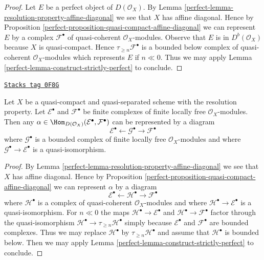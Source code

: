 \begin{proof}

Let $E$ be a perfect object of $D(\mathcal{O}_X)$.
By Lemma \ref{perfect-lemma-resolution-property-affine-diagonal}
we see that $X$ has affine diagonal. Hence by
Proposition \ref{perfect-proposition-quasi-compact-affine-diagonal}
we can represent $E$ by a complex $\mathcal{F}^\bullet$
of quasi-coherent $\mathcal{O}_X$-modules.
Observe that $E$ is in $D^b(\mathcal{O}_X)$ because
$X$ is quasi-compact. Hence $\tau_{\geq n}\mathcal{F}^\bullet$
is a bounded below complex of quasi-coherent $\mathcal{O}_X$-modules
which represents $E$ if $n \ll 0$. Thus we may apply
Lemma \ref{perfect-lemma-construct-strictly-perfect} to conclude.
\end{proof}

\begin{lemma}
\label{perfect-lemma-resolution-property-map-perfect-complex}
\href{https://stacks.math.columbia.edu/tag/0F8G}{\texttt{Stacks tag 0F8G}}

Let $X$ be a quasi-compact and quasi-separated scheme with the
resolution property. Let $\mathcal{E}^\bullet$ and $\mathcal{F}^\bullet$
be finite complexes of finite locally free $\mathcal{O}_X$-modules.
Then any
$\alpha \in \Hom_{D(\mathcal{O}_X)}(\mathcal{E}^\bullet, \mathcal{F}^\bullet)$
can be represented by a diagram
$$
\mathcal{E}^\bullet \leftarrow \mathcal{G}^\bullet \to \mathcal{F}^\bullet
$$
where $\mathcal{G}^\bullet$ is a bounded complex of finite locally free
$\mathcal{O}_X$-modules and where $\mathcal{G}^\bullet \to \mathcal{E}^\bullet$
is a quasi-isomorphism.
\end{lemma}

\begin{proof}

By Lemma \ref{perfect-lemma-resolution-property-affine-diagonal}
we see that $X$ has affine diagonal. Hence by
Proposition \ref{perfect-proposition-quasi-compact-affine-diagonal}
we can represent $\alpha$ by a diagram
$$
\mathcal{E}^\bullet \leftarrow \mathcal{H}^\bullet \to \mathcal{F}^\bullet
$$
where $\mathcal{H}^\bullet$ is a complex of quasi-coherent
$\mathcal{O}_X$-modules and where
$\mathcal{H}^\bullet \to \mathcal{E}^\bullet$
is a quasi-isomorphism. For $n \ll 0$ the maps
$\mathcal{H}^\bullet \to \mathcal{E}^\bullet$ and
$\mathcal{H}^\bullet \to \mathcal{F}^\bullet$
factor through the quasi-isomorphism
$\mathcal{H}^\bullet \to \tau_{\geq n}\mathcal{H}^\bullet$
simply because $\mathcal{E}^\bullet$ and $\mathcal{F}^\bullet$
are bounded complexes. Thus we may replace $\mathcal{H}^\bullet$
by $\tau_{\geq n}\mathcal{H}^\bullet$ and assume that $\mathcal{H}^\bullet$
is bounded below.
Then we may apply
Lemma \ref{perfect-lemma-construct-strictly-perfect} to conclude.
\end{proof}

